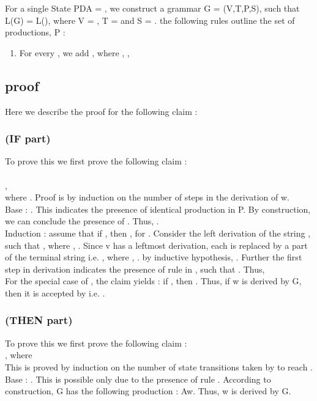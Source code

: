 \documentclass[11pt,a4paper,portrait]{extarticle}
\begin{document}
For a single State PDA  = , we construct a grammar G = (V,T,P,S), such that L(G) = L(), where V = , T =  and S = . the following rules outline the set of productions, P :\\
\begin{enumerate}
\item For every , we add , where , , 
\end{enumerate}

\subsection{proof}
Here we describe the proof for the following claim : 

\subsubsection{(IF part) }
To prove this we first prove the following claim :\\
\\
, \\
where . Proof is by induction on the number of steps in the derivation of w.\\

Base : . 
This indicates the presence of identical production in P. By construction, we can conclude the presence of . 
Thus, .\\

Induction : assume that if , then , for . 
Consider the left derivation of the string , such that , where , . 
Since v has a leftmost derivation, each  is replaced by a part of the terminal string  i.e. , where , . by inductive hypothesis, . 
Further the first step in derivation indicates the presence of rule  in , such that . 
Thus, \\
For the special case of , the claim yields : if , then . 
Thus, if w is derived by G, then it is accepted by  i.e. .

\subsubsection{(THEN part) }
To prove this we first prove the following claim :\\

, where \\
This is proved by induction on the number of state transitions taken by  to reach .\\

Base : . This is possible only due to the presence of rule . According to construction, G has the following production : Aw. Thus, w is derived by G.
\end{document}
